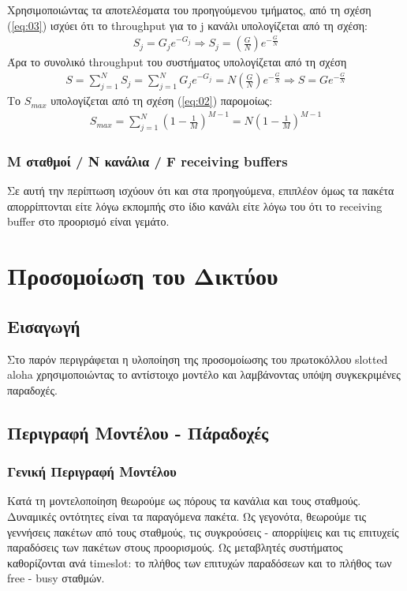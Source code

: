 \documentclass[12pt]{report}
\begin{document}
Χρησιμοποιώντας τα αποτελέσματα του προηγούμενου τμήματος, από τη σχέση (\ref{eq:03}) ισχύει ότι το \textlatin{throughput} για το \textlatin{j} κανάλι υπολογίζεται από τη σχέση:
\begin{align}
  S_j=G_je^{-G_j} \Rightarrow S_j=\left ( \frac{G}{N} \right )e^{-\frac{G}{N}}
\end{align}
Άρα το συνολικό \textlatin{throughput} του συστήματος υπολογίζεται από τη σχέση
\begin{align}
  S=\sum_{j=1}^{N}{S_j}=\sum_{j=1}^{N}{G_je^{-G_j}}=N\left ( \frac{G}{N} \right )e^{-\frac{G}{N}} \Rightarrow S=Ge^{-\frac{G}{N}}
\end{align}
Το \(S_{max}\) υπολογίζεται από τη σχέση (\ref{eq:02}) παρομοίως:
\begin{align}\label{eq:04}
  S_{max}=\sum_{j=1}^{N}\left (1-\frac{1}{M} \right )^{M-1}=N\left (1-\frac{1}{M} \right )^{M-1}
\end{align}

\subsection{\textlatin{M} σταθμοί / \textlatin{N} κανάλια / \textlatin{F} \textlatin{receiving buffers}}
Σε αυτή την περίπτωση ισχύουν ότι και στα προηγούμενα, επιπλέον όμως τα πακέτα απορρίπτονται είτε λόγω εκπομπής στο ίδιο κανάλι είτε λόγω του ότι το \textlatin{receiving buffer} στο προορισμό είναι γεμάτο.


\chapter{Προσομοίωση του Δικτύου}\label{ch3}

\section{Εισαγωγή}
Στο παρόν περιγράφεται η υλοποίηση της προσομοίωσης του πρωτοκόλλου \textlatin{slotted aloha} χρησιμοποιώντας το αντίστοιχο μοντέλο και λαμβάνοντας υπόψη συγκεκριμένες παραδοχές.

\section{Περιγραφή Μοντέλου - Πάραδοχές}\label{model}
\subsection{Γενική Περιγραφή Μοντέλου}
Κατά τη μοντελοποίηση θεωρούμε ως πόρους τα κανάλια και τους σταθμούς. Δυναμικές οντότητες είναι τα παραγόμενα πακέτα. Ως γεγονότα, θεωρούμε τις γεννήσεις πακέτων από τους σταθμούς, τις συγκρούσεις - απορρίψεις και τις επιτυχείς παραδόσεις των πακέτων στους προορισμούς. Ως μεταβλητές συστήματος καθορίζονται ανά \textlatin{timeslot}: το πλήθος των επιτυχών παραδόσεων και το πλήθος των \textlatin{free - busy} σταθμών.
\end{document}
